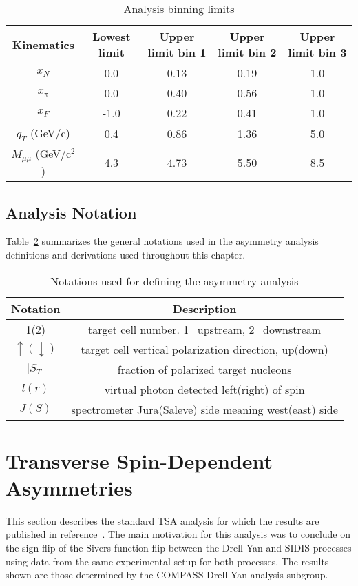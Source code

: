 \begin{table}[h!t]
  \centering
  \begin{tabular}{ |c|c|c|c|c| }
    \hline \textbf{Kinematics}& \textbf{Lowest limit}& \textbf{Upper limit bin
      1}& \textbf{Upper limit bin 2}& \textbf{Upper limit bin 3}\\ \hline
    
    $x_N$& 0.0& 0.13& 0.19& 1.0\\ \hline $x_{\pi}$& 0.0& 0.40& 0.56&
    1.0\\ \hline $x_F$& -1.0& 0.22& 0.41& 1.0\\ \hline $q_T$ (GeV/c)& 0.4& 0.86&
    1.36& 5.0\\ \hline $M_{\mu\mu}$ (GeV/c$^2$)& 4.3& 4.73& 5.50& 8.5 \\ \hline
    
  \end{tabular}
  \caption{Analysis binning limits}
  \label{tab::binning}
\end{table}

\subsection{Analysis Notation}
Table~\ref{tab::ANnotations} summarizes the general notations used in the
asymmetry analysis definitions and derivations used throughout this chapter.

\begin{table}[h!t]
  \centering
  \caption{Notations used for defining the asymmetry analysis}
  \label{tab::ANnotations}
  \begin{tabular}{ |c|c| }
    
    \hline \textbf{Notation}& \textbf{Description}
    \\ \hline 1(2)& target cell
    number. 1=upstream, 2=downstream \\ \hline
    $\uparrow(\downarrow)$ & target
    cell vertical polarization direction, up(down) \\ \hline
    $|S_T|$& fraction of
    polarized target nucleons \\ \hline
    $l(r)$ & virtual photon detected left(right) of spin \\ \hline
    $J(S)$ & spectrometer Jura(Saleve) side meaning west(east) side
    \\ \hline
    
  \end{tabular}
\end{table}

\section{Transverse Spin-Dependent Asymmetries} \label{sec::standTSA}
This section describes the standard TSA analysis for which the results are
published in reference~\cite{compassDYpaper}.  The main motivation for this
analysis was to conclude on the sign flip of the Sivers function flip between
the Drell-Yan and SIDIS processes using data from the same experimental setup
for both processes.  The results shown are those determined by the COMPASS
Drell-Yan analysis subgroup.

